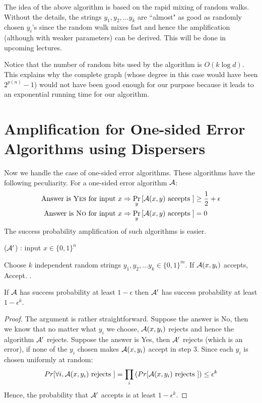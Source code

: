 The idea of the above algorithm is based on the rapid mixing of random walks. Without the details, the strings $y_1, y_2, \ldots y_k$ are ``almost" as good as randomly chosen $y_i$'s since the random walk mixes fast and hence the amplification (although with weaker parameters) can be derived. This will be done in upcoming lectures.

Notice that the number of random bits used by the algorithm is $O(k \log d)$. This explains why the complete graph (whose degree in this case would have been $2^{p(n)}-1$) would not have been good enough for our purpose because it leads to an exponential running time for our algorithm.

\section{Amplification for One-sided Error Algorithms using Dispersers}

Now we handle the case of one-sided error algorithms. These algorithms have the following peculiarity. For a one-sided error algorithm ${\cal{A}}$:
\begin{align}
  \textrm{Answer is {\sc Yes} for input $x$} \Rightarrow \Pr_{y} \left[ {\cal{A}}(x,y) \text{ accepts } \right] & \geq
   \frac{1}{2}+\epsilon \\
  \textrm{Answer is {\sc No} for input $x$} \Rightarrow \Pr_{y}\left[ {\cal{A}}(x,y) \text{ accepts } \right] & =
   0 
\end{align}
The success probability amplification of such algorithms is easier.

\begin{algorithm}
\label{alg:onesided-amplification}
\caption{(${\cal{A}'}$) : input $x \in \{0,1\}^n$} 
\begin{algorithmic}[1]
\State Choose $k$ independent random strings $y_1, y_2, \ldots y_k \in \{0,1\}^m$. 
	\State If ${\cal{A}}(x,y_i)$ accepts, {\sc Accept}.
\EndFor
{}.
\end{algorithmic}
\end{algorithm}

\begin{lemma}
If ${\cal{A}}$ has success probability at least $1-\epsilon$ then ${\cal{A}'}$ has success probability at least $1-\epsilon^k$.
\end{lemma}
\begin{proof}
The argument is rather straightforward. Suppose the answer is {\sc No}, then we know that no matter what $y_i$ we choose, ${\cal{A}}(x,y_i)$ rejects and hence the algorithm ${\cal{A}'}$ rejects. Suppose the answer is {\sc Yes}, then ${\cal{A}'}$ rejects (which is an error), if none of the $y_i$ chosen makes ${\cal{A}}(x,y_i)$ accept in step 3. Since each $y_i$ is chosen uniformly at random:
$$Pr[ \forall i, {\cal{A}}(x,y_i) \textrm{ rejects }
 ] = \prod_{i} \left( Pr[ {\cal{A}}(x,y_i) \textrm{ rejects }] \right) \le \epsilon^k $$
Hence, the probability that  ${\cal{A}'}$ accepts is at least $1-\epsilon^k$.
\end{proof}

